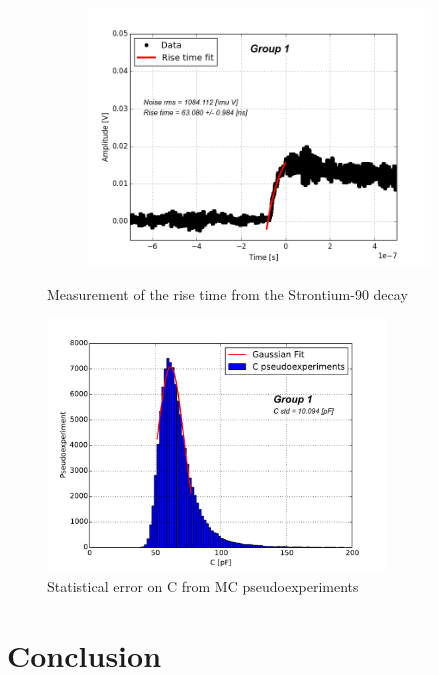 \documentclass[12pt]{article}
\begin{document}
\begin{figure}[t!]
\begin{subfigure}[t]{0.45\textwidth}
  \end{subfigure}
  \hfill
  \begin{subfigure}[t]{0.45\textwidth}
    \centering
    \includegraphics[width=1.2\textwidth]{./graphics/data_11.png}
  \end{subfigure}
\caption{Measurement of the rise time from the Strontium-90 decay}
\label{fig:rise_time_measurement_2}
\end{figure}

\begin{figure}[htb]
  \centering
  \includegraphics[width=0.8\textwidth]{./graphics/stat_error_on_C_pseudoexperiments}
  \caption{Statistical error on C from MC pseudoexperiments}
  \label{fig:stat_error_on_C}
\end{figure}

\section{Conclusion}
\end{document}
